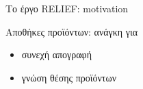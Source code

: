 \begin{frame}{Το έργο RELIEF: motivation}

  Αποθήκες προϊόντων: ανάγκη για

  \begin{itemize}
    \item συνεχή απογραφή
    \item γνώση θέσης προϊόντων
  \end{itemize}


\end{frame}
